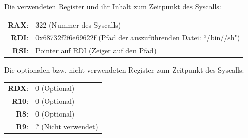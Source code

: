 Die verwendeten Register und ihr Inhalt zum Zeitpunkt des Syscalls:

    \begin{tabular}{rl}
         {\textbf{RAX}:}& {322 (Nummer des Syscalls)}\\
         {\textbf{RDI}:}& {0x68732f2f6e69622f (Pfad der auszuführenden Datei: ``/bin//sh")}\\
         {\textbf{RSI}:}& {Pointer auf RDI (Zeiger auf den Pfad)}
    \end{tabular}

    
Die optionalen bzw. nicht verwendeten Register zum Zeitpunkt des Syscalls:

    \begin{tabular}{rl}
        {\textbf{RDX}:}& {0 (Optional)}\\
        {\textbf{R10}:}& {0 (Optional)}\\
        {\textbf{R8}:}& {0 (Optional)}\\
        {\textbf{R9}:}& {? (Nicht verwendet)}
    \end{tabular}
    